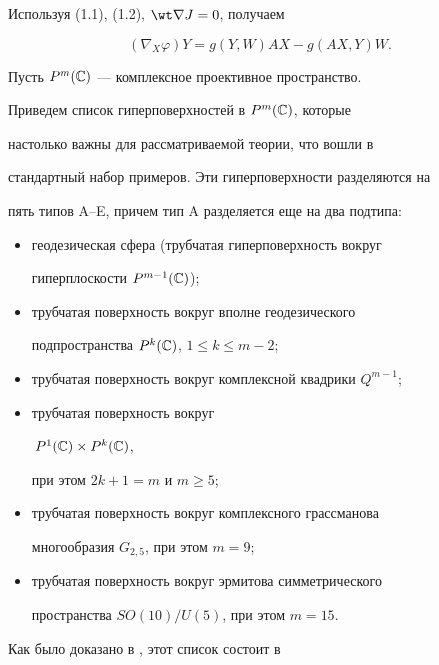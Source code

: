 Используя (1.1), (1.2), $\wt \nabla J=0$, получаем


\begin{equation}


(\nabla _X\varphi)Y=g(Y,W)AX-g(AX,Y)W.


\end{equation}





Пусть $P^m(\Bbb C)$ --- комплексное проективное пространство.


Приведем список гиперповерхностей в $P^m(\Bbb C)$, которые


настолько важны для рассматриваемой теории, что вошли в


стандартный набор примеров. Эти гиперповерхности разделяются на


пять типов A--E, причем тип A разделяется еще на два подтипа:


\begin{itemize}


\item[(A1)] геодезическая сфера (трубчатая гиперповерхность вокруг


гиперплоскости $P^{m-1} (\Bbb C)$);


\item[(A2)] трубчатая поверхность вокруг вполне геодезического


подпространства $P^k(\Bbb C)$, $1\le k\le m-2$;


\item[(B)] трубчатая поверхность вокруг комплексной квадрики $Q^{m-1}$;


\item[(C)] трубчатая поверхность вокруг


$\,P^1(\Bbb C)\times P^k(\Bbb C)$,


при этом $2k+1=m$ и $m\ge 5$;


\item[(D)] трубчатая поверхность вокруг комплексного грассманова


многообразия $G_{2,5}$, при этом $m=9$;


\item[(E)] трубчатая поверхность вокруг эрмитова симметрического


пространства $SO(10)/U(5)$, при этом $m=15$.


\end{itemize}





Как было доказано в \cite{Takagi}, этот список состоит в


